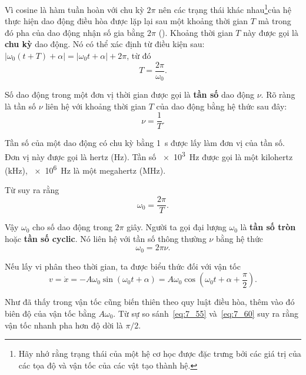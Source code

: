 Vì cosine là hàm tuần hoàn với chu kỳ $2\pi$ nên các trạng thái khác nhau\footnote{Hãy nhớ rằng trạng thái của một hệ cơ học được đặc trưng bởi các giá trị của các tọa độ và vận tốc của các vật tạo thành hệ.}của hệ thực hiện dao động điều hòa được lặp lại sau một khoảng thời gian $T$ mà trong đó pha của dao động nhận số gia bằng $2\pi$ (). Khoảng thời gian $T$ này được gọi là \textbf{chu kỳ} dao động. Nó có thể xác định từ điều kiện sau: $|\omega_0(t+T)+\alpha|=|\omega_0 t+\alpha|+2\pi$, từ đó
\begin{equation}\label{eq:7_56}
	T = \frac{2\pi}{\omega_0}.
\end{equation}

Số dao động trong một đơn vị thời gian được gọi là \textbf{tần số} dao động $\nu$. Rõ ràng là tần số $\nu$ liên hệ với khoảng thời gian $T$ của dao động bằng hệ thức sau đây:
\begin{equation}\label{eq:7_57}
	\nu = \frac{1}{T}.
\end{equation}

\noindent
Tần số của một dao động có chu kỳ bằng \SI{1}{\second} được lấy làm đơn vị của tần số. Đơn vị này được gọi là hertz (\si{\hertz}). Tần số  \SI{e3}{\hertz} được gọi là một kilohertz (\si{\kilo\hertz}), \SI{e6}{\hertz} là một megahertz (\si{\mega\hertz}).

Từ  suy ra rằng
\begin{equation}\label{eq:7_58}
	\omega_0 = \frac{2\pi}{T}.
\end{equation}

\noindent
Vậy $\omega_0$ cho số dao động trong $2\pi$ giây. Người ta gọi đại lượng $\omega_0$ là \textbf{tần số tròn} hoặc \textbf{tần số cyclic}. Nó liên hệ với tần số thông thường $\nu$ bằng hệ thức
\begin{equation}\label{eq:7_59}
	\omega_0 = 2\pi\nu.
\end{equation}

Nếu lấy vi phân  theo thời gian, ta được biểu thức đối với vận tốc
\begin{equation}\label{eq:7_60}
	v = \dot{x} = -A\omega_0\sin(\omega_0 t + \alpha) = A\omega_0\cos\left(\omega_0 t + \alpha + \frac{\pi}{2}\right).
\end{equation}

\noindent
Như đã thấy trong  vận tốc cũng biến thiên theo quy luật điều hòa, thêm vào đó biên độ của vận tốc bằng $A\omega_0$. Từ sự so sánh~\eqref{eq:7_55} và~\eqref{eq:7_60} suy ra rằng vận tốc nhanh pha hơn độ dời là $\pi/2$.

